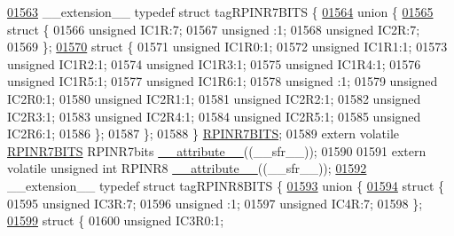 \begin{DoxyCode}
\hypertarget{a00009_source_l01563}{}\hyperlink{a00008}{01563} \_\_extension\_\_ \textcolor{keyword}{typedef} \textcolor{keyword}{struct }tagRPINR7BITS \{
\hypertarget{a00009_source_l01564}{}\hyperlink{a00009}{01564}   \textcolor{keyword}{union }\{
\hypertarget{a00009_source_l01565}{}\hyperlink{a00009}{01565}     \textcolor{keyword}{struct }\{
01566       \textcolor{keywordtype}{unsigned} IC1R:7;
01567       \textcolor{keywordtype}{unsigned} :1;
01568       \textcolor{keywordtype}{unsigned} IC2R:7;
01569     \};
\hypertarget{a00009_source_l01570}{}\hyperlink{a00009}{01570}     \textcolor{keyword}{struct }\{
01571       \textcolor{keywordtype}{unsigned} IC1R0:1;
01572       \textcolor{keywordtype}{unsigned} IC1R1:1;
01573       \textcolor{keywordtype}{unsigned} IC1R2:1;
01574       \textcolor{keywordtype}{unsigned} IC1R3:1;
01575       \textcolor{keywordtype}{unsigned} IC1R4:1;
01576       \textcolor{keywordtype}{unsigned} IC1R5:1;
01577       \textcolor{keywordtype}{unsigned} IC1R6:1;
01578       \textcolor{keywordtype}{unsigned} :1;
01579       \textcolor{keywordtype}{unsigned} IC2R0:1;
01580       \textcolor{keywordtype}{unsigned} IC2R1:1;
01581       \textcolor{keywordtype}{unsigned} IC2R2:1;
01582       \textcolor{keywordtype}{unsigned} IC2R3:1;
01583       \textcolor{keywordtype}{unsigned} IC2R4:1;
01584       \textcolor{keywordtype}{unsigned} IC2R5:1;
01585       \textcolor{keywordtype}{unsigned} IC2R6:1;
01586     \};
01587   \};
01588 \} \hyperlink{a00008_d4/d91/a00733}{RPINR7BITS};
01589 \textcolor{keyword}{extern} \textcolor{keyword}{volatile} \hyperlink{a00008_d4/d91/a00733}{RPINR7BITS} RPINR7bits \hyperlink{a00009_a493c46f03454991ccc5aa7a6e1dfb2a7}{\_\_attribute\_\_}((\_\_sfr\_\_));
01590 
01591 \textcolor{keyword}{extern} \textcolor{keyword}{volatile} \textcolor{keywordtype}{unsigned} \textcolor{keywordtype}{int}  RPINR8 \hyperlink{a00009_a493c46f03454991ccc5aa7a6e1dfb2a7}{\_\_attribute\_\_}((\_\_sfr\_\_));
\hypertarget{a00009_source_l01592}{}\hyperlink{a00008}{01592} \_\_extension\_\_ \textcolor{keyword}{typedef} \textcolor{keyword}{struct }tagRPINR8BITS \{
\hypertarget{a00009_source_l01593}{}\hyperlink{a00009}{01593}   \textcolor{keyword}{union }\{
\hypertarget{a00009_source_l01594}{}\hyperlink{a00009}{01594}     \textcolor{keyword}{struct }\{
01595       \textcolor{keywordtype}{unsigned} IC3R:7;
01596       \textcolor{keywordtype}{unsigned} :1;
01597       \textcolor{keywordtype}{unsigned} IC4R:7;
01598     \};
\hypertarget{a00009_source_l01599}{}\hyperlink{a00009}{01599}     \textcolor{keyword}{struct }\{
01600       \textcolor{keywordtype}{unsigned} IC3R0:1;

\end{DoxyCode}
